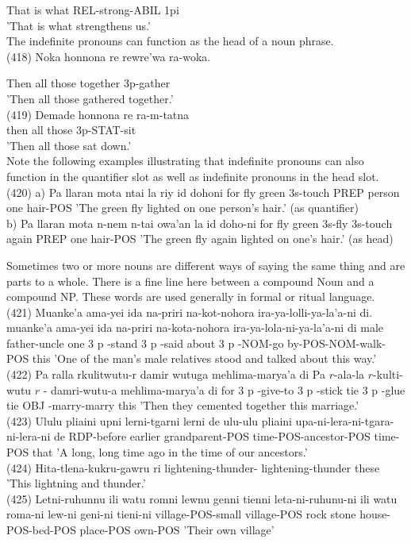 \documentclass[10pt]{article}
\begin{document}
That is what REL-strong-ABIL 1pi\\
'That is what strengthens us.'\\
The indefinite pronouns can function as the head of a noun phrase.\\
(418) Noka honnona re rewre'wa ra-woka.

Then all those together 3p-gather\\
'Then all those gathered together.'\\
(419) Demade honnona re ra-m-tatna\\
then all those 3p-STAT-sit\\
'Then all those sat down.'\\
Note the following examples illustrating that indefinite pronouns can also function in the quantifier slot as well as indefinite pronouns in the head slot.\\
(420) a) Pa llaran mota ntai la riy id dohoni for fly green 3s-touch PREP person one hair-POS 'The green fly lighted on one person's hair.' (as quantifier)\\
b) Pa llaran mota n-nem n-tai owa'an la id doho-ni for fly green 3s-fly 3s-touch again PREP one hair-POS 'The green fly again lighted on one's hair.' (as head)

Sometimes two or more nouns are different ways of saying the same thing and are parts to a whole. There is a fine line here between a compound Noun and a compound NP. These words are used generally in formal or ritual language.\\
(421) Muanke'a ama-yei ida na-priri na-kot-nohora ira-ya-lolli-ya-la'a-ni di. muanke'a ama-yei ida na-priri na-kota-nohora ira-ya-lola-ni-ya-la'a-ni di male father-uncle one 3 p -stand 3 p -said about 3 p -NOM-go by-POS-NOM-walk-POS this 'One of the man's male relatives stood and talked about this way.'\\
(422) Pa ralla rkulitwutu-r damir wutuga mehlima-marya'a di Pa \(r\)-ala-la \(r\)-kulti-wutu \(r\) - damri-wutu-a mehlima-marya'a di for 3 p -give-to 3 p -stick tie 3 p -glue tie OBJ -marry-marry this 'Then they cemented together this marriage.'\\
(423) Ululu pliaini upni lerni-tgarni lerni de ulu-ulu pliaini upa-ni-lera-ni-tgara-ni-lera-ni de RDP-before earlier grandparent-POS time-POS-ancestor-POS time-POS that 'A long, long time ago in the time of our ancestors.'\\
(424) Hita-tlena-kukru-gawru ri lightening-thunder- lightening-thunder these 'This lightning and thunder.'\\
(425) Letni-ruhunnu ili watu romni lewnu genni tienni leta-ni-ruhunu-ni ili watu roma-ni lew-ni geni-ni tieni-ni village-POS-small village-POS rock stone house-POS-bed-POS place-POS own-POS 'Their own village'
\end{document}
